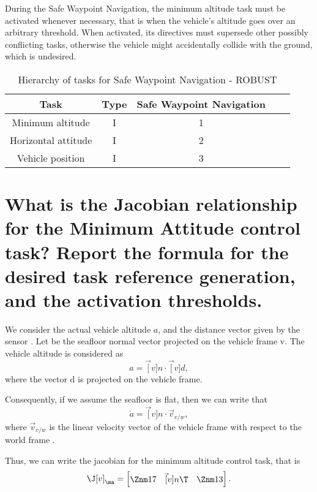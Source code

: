 \begin{questions}
\begin{parts}
\begin{solutionorbox}
			During the Safe Waypoint Navigation, the minimum
			altitude task must be activated whenever necessary, that
			is when the vehicle's altitude goes over an arbitrary
			threshold. When activated, its directives must
			supersede other possibly conflicting tasks, otherwise
			the vehicle might accidentally collide with the ground,
			which is undesired.
		\end{solutionorbox}
		\begin{table}[htb]
			\caption{Hierarchy of tasks for Safe Waypoint Navigation
			- ROBUST }
			\label{table:tkip_safe_waypoint_navigation_robust}
			\begin{center}
				\footnotesize
				\begin{tabular}{ccccc}
					\toprule
					Task & Type & Safe Waypoint Navigation
					\\
					\midrule
					Minimum altitude & I & 1 \\
					\hdashline
					Horizontal attitude & I & 2 \\
					\hdashline
					Vehicle position & I & 3 \\
					\bottomrule
				\end{tabular}
			\end{center}
		\end{table}%


		\part{What is the Jacobian relationship for the Minimum Attitude
			control task? Report the formula for the desired task reference generation, and
		the activation thresholds.}

		\begin{solutionorbox}
			We consider the actual vehicle altitude $a$, and the
			distance vector given by the sensor . Let  be the
			seafloor normal vector projected on the vehicle frame
			\cframe v.
			The vehicle altitude is considered as \[
				a = \vec[v]n\cdot\vec[v]d\mathrm{,}
			\] where the vector
			\vect d is projected on the vehicle frame.

			Consequently, if we assume the seafloor is flat, then we
			can write that \[
				\dot a = \vec[v]n\cdot\vec{v}_{v/w}\mathrm{,}
			\] where $\vec{v}_{v/w}$ is the linear
			velocity vector of the vehicle frame  with
			respect to the world frame .

			Thus, we can write the jacobian for the minimum
			altitude control task, that is \[
				\J[v]_{\ma} = \begin{bmatrix}
					\Znm17\quad
					\vec[v]n\T\quad
					\Znm13
				\end{bmatrix}\mathrm{.}
			\]


\end{solutionorbox}
\end{parts}
\end{questions}
